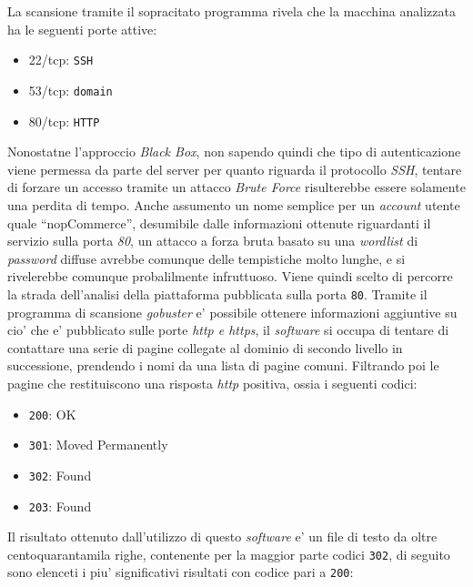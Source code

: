 \documentclass[a4paper]{report}
\newcommand{\quotes}[1]{``#1''}
\begin{document}
			La scansione tramite il sopracitato programma rivela che la macchina analizzata ha le seguenti porte attive:
			\begin{itemize}
				\item 22/tcp: \texttt{SSH}
				\item 53/tcp: \texttt{domain}
				\item 80/tcp: \texttt{HTTP}
			\end{itemize}
			Nonostatne l'approccio \emph{Black Box}, non sapendo quindi che tipo di autenticazione viene permessa da
			parte del server per quanto riguarda il protocollo \emph{SSH}, tentare di forzare un accesso tramite un
			attacco \emph{Brute Force} risulterebbe essere solamente una perdita di tempo. Anche assumento un nome
			semplice per un \emph{account} utente quale \quotes{nopCommerce}, desumibile dalle informazioni ottenute
			riguardanti il servizio sulla porta \emph{80}, un attacco a forza bruta basato su una \emph{wordlist} di
			\emph{password} diffuse avrebbe comunque delle tempistiche molto lunghe, e si rivelerebbe comunque
			probalilmente infruttuoso.  Viene quindi scelto di percorre la strada dell'analisi della piattaforma
			pubblicata sulla porta \texttt{80}.  Tramite il programma di scansione \emph{gobuster}\label{gobuster} e'
			possibile ottenere informazioni aggiuntive su cio' che e' pubblicato sulle porte \emph{http e https}, il
			\emph{software} si occupa di tentare di contattare una serie di pagine collegate al dominio di secondo
			livello in successione, prendendo i nomi da una lista di pagine comuni. Filtrando poi le pagine che
			restituiscono una risposta \emph{http} positiva, ossia i seguenti codici:
			\begin{itemize}
				\item \texttt{200}: OK
				\item \texttt{301}: Moved Permanently
				\item \texttt{302}: Found
				\item \texttt{203}: Found
			\end{itemize}
			Il risultato ottenuto dall'utilizzo di questo \emph{software} e' un file di testo da oltre centoquarantamila
			righe, contenente per la maggior parte codici \texttt{302}, di seguito sono elenceti i piu' significativi
			risultati con codice pari a \texttt{200}:
\end{document}

